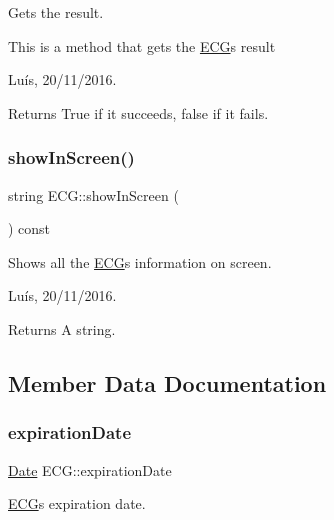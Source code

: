 Gets the result. 

This is a method that gets the \hyperlink{class_e_c_g}{E\+CG}\textquotesingle{}s result

Luís, 20/11/2016. 

\begin{DoxyReturn}{Returns}
True if it succeeds, false if it fails. 
\end{DoxyReturn}
\hypertarget{class_e_c_g_a6c9db502ecbd3d09884fa7a89a194fda}{}\label{class_e_c_g_a6c9db502ecbd3d09884fa7a89a194fda} 
\subsubsection{\texorpdfstring{show\+In\+Screen()}{showInScreen()}}
{\footnotesize\ttfamily string E\+C\+G\+::show\+In\+Screen (\begin{DoxyParamCaption}{ }\end{DoxyParamCaption}) const}



Shows all the \hyperlink{class_e_c_g}{E\+CG}\textquotesingle{}s information on screen. 

Luís, 20/11/2016. 

\begin{DoxyReturn}{Returns}
A string. 
\end{DoxyReturn}


\subsection{Member Data Documentation}
\hypertarget{class_e_c_g_a5b4f40c0eb92a88ebc2817ff09dcced9}{}\label{class_e_c_g_a5b4f40c0eb92a88ebc2817ff09dcced9} 
\subsubsection{\texorpdfstring{expiration\+Date}{expirationDate}}
{\footnotesize\ttfamily \hyperlink{class_date}{Date} E\+C\+G\+::expiration\+Date\hspace{0.3cm}{\ttfamily [private]}}



\hyperlink{class_e_c_g}{E\+CG}\textquotesingle{}s expiration date. 

\hypertarget{class_e_c_g_a29fc67e15b0e5ec13bd4feef93a59df0}{}\label{class_e_c_g_a29fc67e15b0e5ec13bd4feef93a59df0} 
